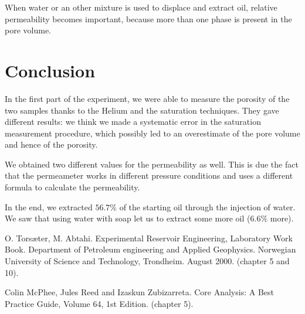 \documentclass[10pt, a4paper]{amsart}
\begin{document}
When water or an other mixture is used to displace and extract oil, relative permeability becomes important, because more than one phase is present in the pore volume.

\section{Conclusion}
In the first part of the experiment, we were able to measure the porosity of the two samples thanks to the Helium and the saturation techniques. They gave different results: we think we made a systematic error in the saturation measurement procedure, which possibly led to an overestimate of the pore volume and hence of the porosity.

We obtained two different values for the permeability as well. This is due the fact that the permeameter works in different pressure conditions and uses a different formula to calculate the permeability.

In the end, we extracted $56.7 \%$ of the starting oil through the injection of water. We saw that using water with soap let us to extract some more oil ($6.6 \%$ more). 


\begin{thebibliography}{3}
O. Tors\ae ter, M. Abtahi. Experimental Reservoir Engineering, Laboratory Work Book. Department of Petroleum engineering and Applied Geophysics. Norwegian University of Science and Technology, Trondheim. August 2000. (chapter 5 and 10).

Colin McPhee, Jules Reed and Izaskun Zubizarreta. Core Analysis: A Best Practice Guide, Volume 64, 1st Edition. (chapter 5).
 
\end{thebibliography}

\newpage

\begin{appendix}
\end{appendix}
\end{document}
